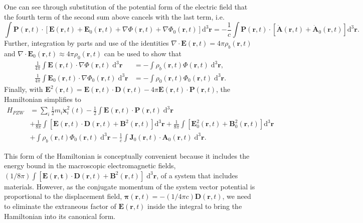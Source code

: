 \documentclass{article}
\begin{document}
One can see through substitution of the potential form of the electric field that the fourth term of the second sum above cancels with the last term, i.e.
\begin{equation}
\int\mathbf{P}(\mathbf{r},t)\cdot\left[\mathbf{E}(\mathbf{r},t) + \mathbf{E}_0(\mathbf{r},t) + \nabla\Phi(\mathbf{r},t) + \nabla\Phi_0(\mathbf{r},t)\right]\mathrm{d}^3\mathbf{r} = -\frac{1}{c}\int\mathbf{P}(\mathbf{r},t)\cdot\left[\dot{\mathbf{A}}(\mathbf{r},t) + \dot{\mathbf{A}}_0(\mathbf{r},t)\right]\mathrm{d}^3\mathbf{r}.
\end{equation}
Further, integration by parts and use of the identities $\nabla\cdot\mathbf{E}(\mathbf{r},t) = 4\pi\rho_b(\mathbf{r},t)$ and $\nabla\cdot\mathbf{E}_0(\mathbf{r},t)\approx4\pi\rho_0(\mathbf{r},t)$ can be used to show that
\begin{equation}
\begin{split}
\frac{1}{4\pi}\int\mathbf{E}(\mathbf{r},t)\cdot\nabla\Phi(\mathbf{r},t)\;\mathrm{d}^3\mathbf{r} &= -\int\rho_b(\mathbf{r},t)\Phi(\mathbf{r},t)\;\mathrm{d}^3\mathbf{r},\\
\frac{1}{4\pi}\int\mathbf{E}_0(\mathbf{r},t)\cdot\nabla\Phi_0(\mathbf{r},t)\;\mathrm{d}^3\mathbf{r} &= -\int\rho_0(\mathbf{r},t)\Phi_0(\mathbf{r},t)\;\mathrm{d}^3\mathbf{r}.
\end{split}
\end{equation}
Finally, with $\mathbf{E}^2(\mathbf{r},t) = \mathbf{E}(\mathbf{r},t)\cdot\mathbf{D}(\mathbf{r},t) - 4\pi\mathbf{E}(\mathbf{r},t)\cdot\mathbf{P}(\mathbf{r},t)$, the Hamiltonian simplifies to
\begin{equation}\label{eq:Hpzw}
\begin{split}
H_{PZW} &= \sum_i\frac{1}{2}m_i\dot{\mathbf{x}}_i^2(t) - \frac{1}{2}\int\mathbf{E}(\mathbf{r},t)\cdot\mathbf{P}(\mathbf{r},t)\;\mathrm{d}^3\mathbf{r}\\
& + \frac{1}{8\pi}\int\left[\mathbf{E}(\mathbf{r},t)\cdot\mathbf{D}(\mathbf{r},t) + \mathbf{B}^2(\mathbf{r},t)\right]\mathrm{d}^3\mathbf{r} + \frac{1}{8\pi}\int\left[\mathbf{E}_0^2(\mathbf{r},t) + \mathbf{B}_0^2(\mathbf{r},t)\right]\mathrm{d}^3\mathbf{r}\\
& + \int\rho_b(\mathbf{r},t)\Phi_0(\mathbf{r},t)\;\mathrm{d}^3\mathbf{r} - \frac{1}{c}\int\mathbf{J}_0(\mathbf{r},t)\cdot\mathbf{A}_0(\mathbf{r},t)\;\mathrm{d}^3\mathbf{r}.
\end{split}
\end{equation}

This form of the Hamiltonian is conceptually convenient because it includes the energy bound in the macroscopic electromagnetic fields, $(1/8\pi)\int[\mathbf{E}(\mathbf{r,t})\cdot\mathbf{D}(\mathbf{r},t) + \mathbf{B}^2(\mathbf{r},t)]\;\mathrm{d}^3\mathbf{r}$, of a system that includes materials. However, as the conjugate momentum of the system vector potential is proportional to the displacement field, $\bm{\pi}(\mathbf{r},t) = -(1/4\pi c)\mathbf{D}(\mathbf{r},t)$, we need to eliminate the extraneous factor of $\mathbf{E}(\mathbf{r},t)$ inside the integral to bring the Hamiltonian into its canonical form.
\end{document}
